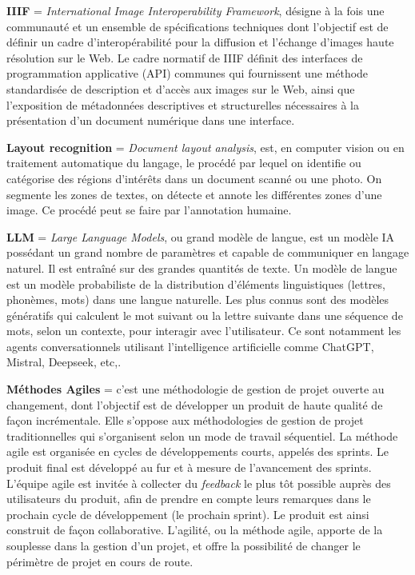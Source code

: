 \textbf{IIIF} = \textit{International Image Interoperability Framework}, désigne à la fois une communauté et un ensemble de spécifications techniques dont l’objectif est de définir un cadre d’interopérabilité pour la diffusion et l'échange d’images haute résolution sur le Web. Le cadre normatif de IIIF définit des interfaces de programmation applicative (API) communes qui fournissent une méthode standardisée de description et d'accès aux images sur le Web, ainsi que l'exposition de métadonnées descriptives et structurelles nécessaires à la présentation d'un document numérique dans une interface.

\textbf{Layout recognition} = \textit{Document layout analysis}, est, en computer vision ou en traitement automatique du langage, le procédé par lequel on identifie ou catégorise des régions d'intérêts dans un document scanné ou une photo. On segmente les zones de textes, on détecte et annote les différentes zones d'une image. Ce procédé peut se faire par l'annotation humaine.

\textbf{LLM} = \textit{Large Language Models}, ou grand modèle de langue, est un modèle IA possédant un grand nombre de paramètres et capable de communiquer en langage naturel. Il est entraîné sur des grandes quantités de texte.
Un modèle de langue est un modèle probabiliste de la distribution d’éléments linguistiques (lettres, phonèmes, mots) dans une langue naturelle. Les plus connus sont des modèles génératifs qui calculent le mot suivant ou la lettre suivante dans une séquence de mots, selon un contexte, pour interagir avec l’utilisateur. Ce sont notamment les agents conversationnels utilisant l'intelligence artificielle comme ChatGPT, Mistral, Deepseek, etc,.

\textbf{Méthodes Agiles} = c'est une méthodologie de gestion de projet ouverte au changement, dont l’objectif est de développer un produit de haute qualité de façon incrémentale. Elle s’oppose aux méthodologies de gestion de projet traditionnelles qui s’organisent selon un mode de travail séquentiel. La méthode agile est organisée en cycles de développements courts, appelés des sprints. Le produit final est développé au fur et à mesure de l’avancement des sprints. L’équipe agile est invitée à collecter du \textit{feedback} le plus tôt possible auprès des utilisateurs du produit, afin de prendre en compte leurs remarques dans le prochain cycle de développement (le prochain sprint). Le produit est ainsi construit de façon collaborative. L’agilité, ou la méthode agile, apporte de la souplesse dans la gestion d’un projet, et offre la possibilité de changer le périmètre de projet en cours de route.


